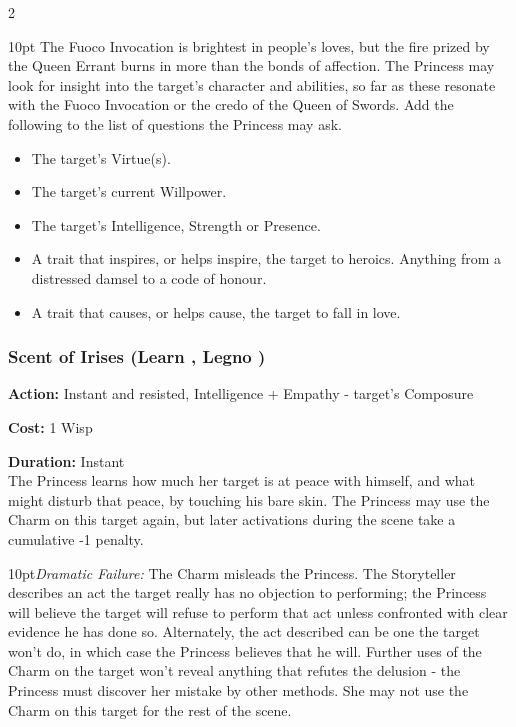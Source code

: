 \begin{multicols}{2}
\begin{myindentpar}{10pt}
The Fuoco Invocation is brightest in people's loves, but the fire prized by the Queen Errant burns in more than the bonds of affection. The Princess may look for insight into the target's character and abilities, so far as these resonate with the Fuoco Invocation or the credo of the Queen of Swords. Add the following to the list of questions the Princess may ask.

\begin{itemize}
 \item The target's Virtue(s).
 \item The target's current Willpower.
 \item The target's Intelligence, Strength or Presence.
 \item A trait that inspires, or helps inspire, the target to heroics. Anything from a distressed damsel to a code of honour. 
 \item A trait that causes, or helps cause, the target to fall in love. 
 \end{itemize}\end{myindentpar}

\subsubsection*{Scent of Irises (Learn \textbullet\textbullet, Legno \textbullet)}

\noindent \textbf{Action:} Instant and resisted, Intelligence + Empathy - target's Composure

\noindent \textbf{Cost:} 1 Wisp

\noindent \textbf{Duration:} Instant\\

\noindent The Princess learns how much her target is at peace with himself, and what might disturb that peace, by touching his bare skin. The Princess may use the Charm on this target again, but later activations during the scene take a cumulative -1 penalty.


\begin{myindentpar}{10pt}\emph{Dramatic Failure:} The Charm misleads the Princess. The Storyteller describes an act the target really has no objection to performing; the Princess will believe the target will refuse to perform that act unless confronted with clear evidence he has done so. Alternately, the act described can be one the target won't do, in which case the Princess believes that he will. Further uses of the Charm on the target won't reveal anything that refutes the delusion - the Princess must discover her mistake by other methods. She may not use the Charm on this target for the rest of the scene.


\end{myindentpar}
\end{multicols}
